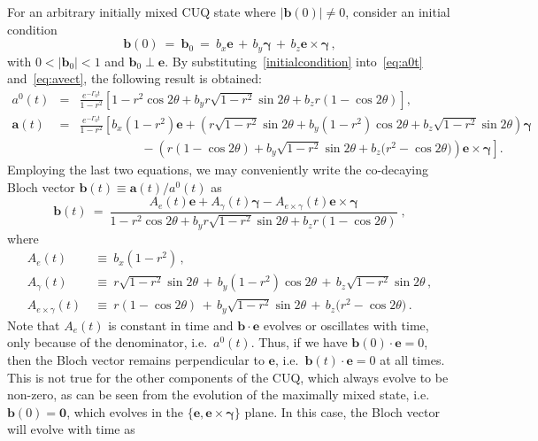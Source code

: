 \documentclass[12pt,a4paper]{article}
\begin{document}
For an arbitrary initially mixed CUQ state where $|\mathbf{b}(0)| \neq 0$, consider an initial condition
\begin{equation}
    \mathbf{b}(0)\: =\: \mathbf{b}_0\: =\: b_{x}\mathbf{e}\,+\, b_{y} \boldsymbol{\gamma}\, +\, b_{z} \mathbf{e}\times \boldsymbol{\gamma}\,,\label{initialcondition}
\end{equation}
with $0<|\mathbf{b}_0|<1$ and $\mathbf{b}_0\perp \mathbf{e}$.
By substituting~\eqref{initialcondition} into~\eqref{eq:a0t} and~\eqref{eq:avect}, the following result is obtained:
\begin{eqnarray}
        a^0(t) \!&=&\! \frac{e^{-\Gamma_0 t}}{1-r^2}\left[1-r^2\cos{2\theta + b_{y} r\sqrt{1-r^2}\sin{2\theta}}+b_{z}r(1-\cos{2\theta})\right],\\[3mm]
        \mathbf{a}(t) \!&=&\! \frac{e^{-\Gamma_0 t}}{1-r^2}\left[b_{x}(1-r^2)\mathbf{e}+\left(r\sqrt{1-r^2}\sin{2\theta}+ b_{y} (1-r^2)\cos{2\theta}+b_{z}\sqrt{1-r^2}\sin{2\theta}\right)\boldsymbol{\gamma} \right.\nonumber\\
        &&\quad\quad\quad\quad\quad -\left. \left(r(1-\cos{2\theta})+b_{y}\sqrt{1-r^2}\sin{2\theta}+ b_{z} (r^2-\cos{2\theta)}\right)\mathbf{e}\times\boldsymbol{\gamma}\right].
\end{eqnarray}
Employing the last two equations, we may conveniently write the co-decaying Bloch vector $\mathbf{b}(t) \equiv \mathbf{a}(t)/a^0(t)$ as
\begin{equation}
  \label{mixCUQ_sol} 
    \mathbf{b}(t)\: =\: \dfrac{A_e(t)\mathbf{e}+A_{\gamma}(t)\boldsymbol{\gamma}- A_{e\times\gamma}(t)\mathbf{e}\times\boldsymbol{\gamma}}{1-r^2\cos{2\theta + b_{y} r\sqrt{1-r^2}\sin{2\theta}}+b_{z}r(1-\cos{2\theta})}\;,
\end{equation}
where
\begin{equation}
\begin{aligned}    
    A_e(t)\ &\equiv\ b_x(1-r^2)\,,\\
    A_{\gamma}(t)\ &\equiv\ r\sqrt{1-r^2}\sin{2\theta}\,+\,b_{y}(1-r^2)\cos{2\theta}\,+\,b_{z}\sqrt{1-r^2}\sin{2\theta}\,,\\
    A_{e\times\gamma}(t)\ &\equiv\ r(1-\cos{2\theta})\,+\,b_{y}\sqrt{1-r^2}\sin{2\theta}\,+\,b_{z}(r^2-\cos{2\theta)}\,.
\end{aligned}
\end{equation}
Note that $A_e(t)$ is  constant in time and $\mathbf{b}\cdot\mathbf{e}$ evolves or oscillates with time, only because of the denominator, i.e.~$a^0(t)$. Thus, if we have $\mathbf{b}(0)\cdot\mathbf{e} = 0$, then the Bloch vector remains perpendicular to $\mathbf{e}$, i.e.~$\mathbf{b}(t)\cdot\mathbf{e}=0$ at all times. This is not true for the other components of the CUQ, which always evolve to be non-zero, as can be seen from the evolution of the maximally mixed state, i.e.~$\mathbf{b}(0)=\mathbf{0}$, which evolves in the $\{\mathbf{e},\mathbf{e}\times\boldsymbol{\gamma}\}$ plane. In this case, the Bloch vector will evolve with time as
\end{document}
